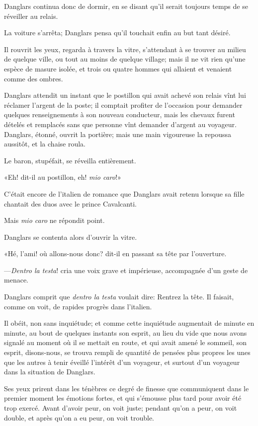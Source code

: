 Danglars continua donc de dormir, en se disant qu'il serait toujours temps de se réveiller au relais. 

La voiture s'arrêta; Danglars pensa qu'il touchait enfin au but tant désiré. 

Il rouvrit les yeux, regarda à travers la vitre, s'attendant à se trouver au milieu de quelque ville, ou tout au moins de quelque village; mais il ne vit rien qu'une espèce de masure isolée, et trois ou quatre hommes qui allaient et venaient comme des ombres. 

Danglars attendit un instant que le postillon qui avait achevé son relais vînt lui réclamer l'argent de la poste; il comptait profiter de l'occasion pour demander quelques renseignements à son nouveau conducteur, mais les chevaux furent dételés et remplacés sans que personne vînt demander d'argent au voyageur. Danglars, étonné, ouvrit la portière; mais une main vigoureuse la repoussa aussitôt, et la chaise roula. 

Le baron, stupéfait, se réveilla entièrement. 

«Eh! dit-il au postillon, eh! \textit{mio caro}!» 

C'était encore de l'italien de romance que Danglars avait retenu lorsque sa fille chantait des duos avec le prince Cavalcanti. 

Mais \textit{mio caro} ne répondit point. 

Danglars se contenta alors d'ouvrir la vitre. 

«Hé, l'ami! où allons-nous donc? dit-il en passant sa tête par l'ouverture. 

—\textit{Dentro la testa}! cria une voix grave et impérieuse, accompagnée d'un geste de menace. 

Danglars comprit que \textit{dentro la testa} voulait dire: Rentrez la tête. Il faisait, comme on voit, de rapides progrès dans l'italien. 

Il obéit, non sans inquiétude; et comme cette inquiétude augmentait de minute en minute, au bout de quelques instants son esprit, au lieu du vide que nous avons signalé au moment où il se mettait en route, et qui avait amené le sommeil, son esprit, disons-nous, se trouva rempli de quantité de pensées plus propres les unes que les autres à tenir éveillé l'intérêt d'un voyageur, et surtout d'un voyageur dans la situation de Danglars. 

Ses yeux prirent dans les ténèbres ce degré de finesse que communiquent dans le premier moment les émotions fortes, et qui s'émousse plus tard pour avoir été trop exercé. Avant d'avoir peur, on voit juste; pendant qu'on a peur, on voit double, et après qu'on a eu peur, on voit trouble. 

